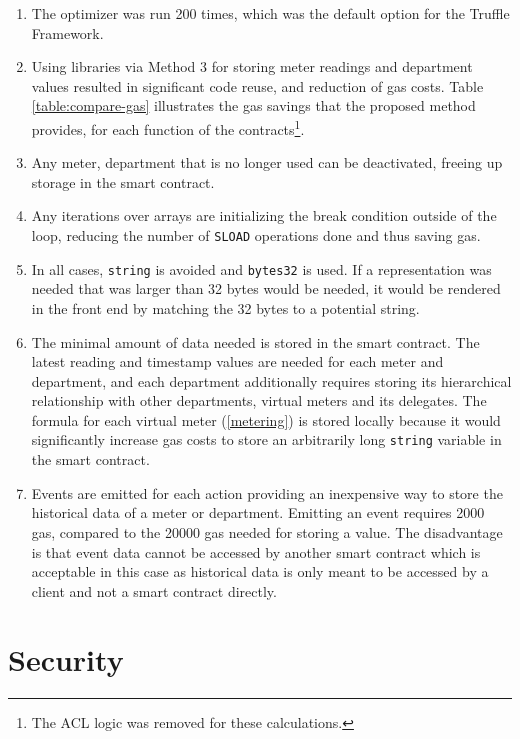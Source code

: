 \begin{enumerate}
    \item The optimizer was run 200 times, which was the default option for the Truffle Framework.
    \item Using libraries via Method 3 for storing meter readings and department values resulted in significant code reuse, and reduction of gas costs. Table \ref{table:compare-gas} illustrates the gas savings that the proposed method provides, for each function of the contracts\footnote{The ACL logic was removed for these calculations.}.
    \item Any meter, department that is no longer used can be deactivated, freeing up storage in the smart contract.
    \item Any iterations over arrays are initializing the break condition outside of the loop, reducing the number of \texttt{SLOAD} operations done and thus saving gas.
    \item In all cases, \texttt{string} is avoided and \texttt{bytes32} is used. If a representation was needed that was larger than 32 bytes would be needed, it would be rendered in the front end by matching the 32 bytes to a potential string. 
    \item The minimal amount of data needed is stored in the smart contract. The latest reading and timestamp values are needed for each meter and department, and each department additionally requires storing its hierarchical relationship with other departments, virtual meters and its delegates. The formula for each virtual meter (\ref{metering}) is stored locally because it would significantly increase gas costs to store an arbitrarily long \texttt{string} variable in the smart contract.
    \item Events are emitted for each action providing an inexpensive way to store the historical data of a meter or department. Emitting an event requires 2000 gas, compared to the 20000 gas needed for storing a value. The disadvantage is that event data cannot be accessed by another smart contract which is acceptable in this case as historical data is only meant to be accessed by a client and not a smart contract directly. 
\end{enumerate}



\section{Security}

